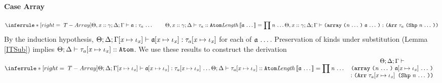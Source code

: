 \begin{sproof}
  \paragraph{Case {\sc Array}}
  \[{\infr[T-Array]
    {\sequence{\typeof{\sEnv, \hassort{\var}{\sort}}{\kEnv}{\tEnv}
        {\atom}{\type_a}}
      \qquad {\kindof{\sEnv, \hassort{\var}{\sort}}{\kEnv}
        {\type_a}{\kindatom}}
      \\\\ {\mathit{Length}\llb \sequence{\atom} \rrb
        = \prod{\sequence{\nat}}}}
    {\typeof{\sEnv,\hassort{\var}{\sort}}{\kEnv}{\tEnv}
      {\arrlit{\sequence{\atom}}{\sequence{\nat}}}
      {\typearray{\type_a}{\idxshape{\sequence{\nat}}}}}}\]
  By the induction hypothesis,
  $\Theta;\Delta;\Gamma\hspace{-2pt}\left[ \mathit{x} \mapsto \mathit{\iota}_{\mathit{x}} \right] \vdash \mathfrak{a}\hspace{-2pt}\left[ \mathit{x} \mapsto \mathit{\iota}_{\mathit{x}} \right] : \mathit{\tau}_a\hspace{-2pt}\left[ \mathit{x} \mapsto \mathit{\iota}_{\mathit{x}} \right]$
  for each of $\mathfrak{a} \, \ldots \,$.
  Preservation of kinds under substitution (Lemma \ref{ITSub}) implies
  $\Theta;\Delta \vdash \mathit{\tau}_a\hspace{-2pt}\left[ \mathit{x} \mapsto \mathit{\iota}_{\mathit{x}} \right] :: \text{\tt Atom}$.
  We use these results to construct the derivation
  \[{\infr[T-Array]
    {\sequence{\typeof{\sEnv}{\kEnv}{\idxsubst{\tEnv}}
        {\idxsubst{\atom}}{\idxsubst{\type_a}}}
      \\\\ {\kindof{\sEnv}{\kEnv}
        {\idxsubst{\type_a}}{\kindatom}}
      \\\\ {\mathit{Length}\llb \sequence{\atom} \rrb
        = \prod{\sequence{\nat}}}}
    {\parbox{0.45\textwidth}
      {\centering
        \({\sEnv};{\kEnv};{\tEnv}\vdash\)
        \({\arrlit{\sequence{\idxsubst{\atom}}}{\sequence{\nat}}}\)\\
        \(:{\typearray{\idxsubst{\type_a}}{\idxshape{\sequence{\nat}}}}\)}}}\]

\end{sproof}
